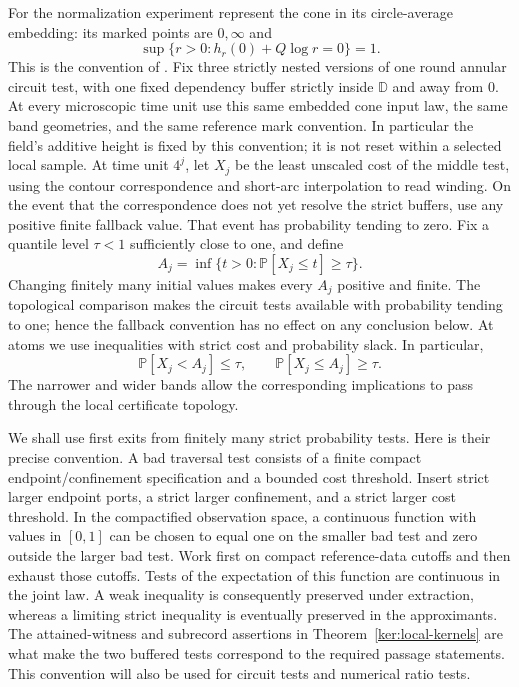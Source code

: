 \documentclass[11pt]{article}
\numberwithin{equation}{section}
\theoremstyle{definition}
\theoremstyle{remark}
\newcommand{\PP}{\mathbb P}
\newcommand{\1}{\mathbf 1}
\begin{document}
For the normalization experiment represent the cone in its
circle-average embedding: its marked points are $0,\infty$ and
\[
 \sup\{r>0:h_r(0)+Q\log r=0\}=1.
\]
This is the convention of \cite[Definition~4.10]{DMSMating}.
Fix three strictly nested versions of one round annular circuit test,
with one fixed dependency buffer strictly inside $\mathbb D$ and
away from $0$.  At every microscopic time unit use this same embedded
cone input law, the same band geometries, and the same reference
mark convention.  In particular the field's additive height is fixed
by this convention; it is not reset within a selected local sample.
At time unit $4^j$, let $X_j$ be the least unscaled cost of the
middle test, using the contour correspondence and short-arc
interpolation to read winding.  On the event that the correspondence
does not yet resolve the strict buffers, use any positive finite
fallback value.  That event has probability tending to zero.  Fix a
quantile level $\tau<1$ sufficiently close to one, and define
\begin{equation}
 A_j=\inf\{t>0:\PP[X_j\leq t]\geq\tau\}.
 \label{met:quantile}
\end{equation}
Changing finitely many initial values makes every $A_j$ positive and
finite.  The topological comparison makes the circuit tests available
with probability tending to one; hence the fallback convention has no
effect on any conclusion below.  At atoms we use inequalities with
strict cost and probability slack.  In particular,
\[
 \PP[X_j<A_j]\leq\tau,\qquad
 \PP[X_j\leq A_j]\geq\tau.
\]
The narrower and wider bands allow the corresponding implications to
pass through the local certificate topology.

We shall use first exits from finitely many strict probability tests.
Here is their precise convention.  A bad traversal test consists of a
finite compact endpoint/confinement specification and a bounded cost
threshold.  Insert strict larger endpoint ports, a strict larger
confinement, and a strict larger cost threshold.  In the compactified
observation space, a continuous function with values in $[0,1]$ can be
chosen to equal one on the smaller bad test and zero outside the larger
bad test.  Work first on compact reference-data cutoffs and then
exhaust those cutoffs.  Tests of the expectation of this function are
continuous in the joint law.  A weak inequality is consequently
preserved under extraction, whereas a limiting strict inequality is
eventually preserved in the approximants.  The attained-witness and
subrecord assertions in Theorem~\ref{ker:local-kernels} are what make
the two buffered tests correspond to the required passage statements.
This convention will also be used for circuit tests and numerical
ratio tests.
\end{document}
